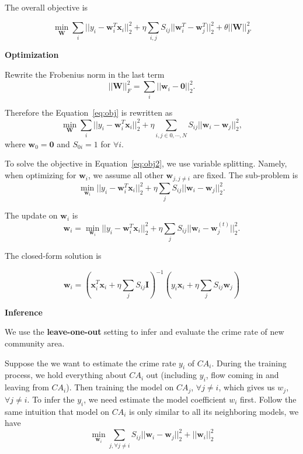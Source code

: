 The overall objective is

\begin{equation}
\label{eq:obj}
\min_{\mathbf{W}}  \sum_i || y_i - \mathbf{w}_i^T \mathbf{x}_i ||_2^2 + \eta \sum_{i,j} S_{ij} ||\mathbf{w}_i^T - \mathbf{w}_j^T||_2^2 
+ \theta || \mathbf{W} ||_F^2
\end{equation}




\textbf{Optimization}


Rewrite the Frobenius norm in the last term
\[
|| \mathbf{W} ||_F^2 = \sum_i || \mathbf{w}_i - \mathbf{0}||_2^2.
\]


Therefore the Equation~\ref{eq:obj} is rewritten as
\begin{equation}
\label{eq:obj2}
\min_{\mathbf{W}}  \sum_i || y_i - \mathbf{w}_i^T \mathbf{x}_i ||_2^2 + \eta \sum_{i,j \in 0, \cdots, N} S_{ij} || \mathbf{w}_i - \mathbf{w}_j ||_2^2,
\end{equation}
where $\mathbf{w}_0 = \mathbf{0}$ and $S_{0i} = 1$ for $\forall i$.


To solve the objective in Equation~\ref{eq:obj2}, we use variable splitting. Namely, when optimizing for $\mathbf{w}_i$, we assume all other $\mathbf{w}_{j, j\neq i}$ are fixed. The sub-problem is
\begin{equation}
\label{eq:subobj}
\min_{\mathbf{w}_i}   ||y_i - \mathbf{w}_i^T \mathbf{x}_i ||_2^2 + \eta \sum_j S_{ij}|| \mathbf{w}_i - \mathbf{w}_j||_2^2.
\end{equation}



The update on $\mathbf{w}_i$ is
\[
\mathbf{w}_i = \min_{\mathbf{w}_i}   ||y_i - \mathbf{w}_i^T \mathbf{x}_i ||_2^2 + \eta \sum_j S_{ij} || \mathbf{w}_i - \mathbf{w}_j^{(t)} ||_2^2.
\]

The closed-form solution is

\begin{equation}
\mathbf{w}_i = (\mathbf{x}_i^T \mathbf{x}_i + \eta \sum_j S_{ij} \mathbf{I} )^{-1} (y_i \mathbf{x}_i + \eta \sum_j S_{ij} \mathbf{w}_j) 
\end{equation}


\textbf{Inference}

We use the \textbf{leave-one-out} setting to infer and evaluate the crime rate of new community area. 

Suppose the we want to estimate the crime rate $y_i$ of $CA_i$. During the training process, we hold everything about $CA_i$ out (including $y_i$, flow coming in and leaving from $CA_i$). Then training the model on $CA_j$, $\forall j \neq i$, which gives us $w_j$, $\forall j \neq i$. To infer the $y_i$, we need estimate the model coefficient $w_i$ first. Follow the same intuition that model on $CA_i$ is only similar to all its neighboring models, we have
\begin{equation}
\min_{\mathbf{w}_i} \sum_{j, \forall j \neq i} S_{ij} || \mathbf{w}_i - \mathbf{w}_j ||_2^2 + || \mathbf{w}_i ||_2^2
\end{equation}


